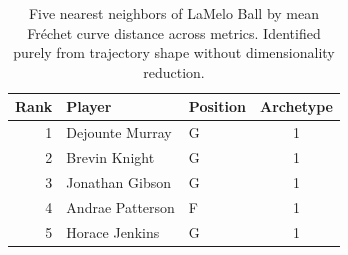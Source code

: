 \begin{table}[htbp]
  \centering\small
  \begin{tabular}{rllc}
    \toprule
    Rank & Player & Position & Archetype \\
    \midrule
    1 & Dejounte Murray & G & 1 \\
    2 & Brevin Knight & G & 1 \\
    3 & Jonathan Gibson & G & 1 \\
    4 & Andrae Patterson & F & 1 \\
    5 & Horace Jenkins & G & 1 \\
    \bottomrule
  \end{tabular}
  \caption{Five nearest neighbors of LaMelo Ball by mean Fr\'{e}chet curve distance across metrics. Identified purely from trajectory shape without dimensionality reduction.}
  \label{tab:LaMelo_Ball_frechet_curve_neighbors}
\end{table}

